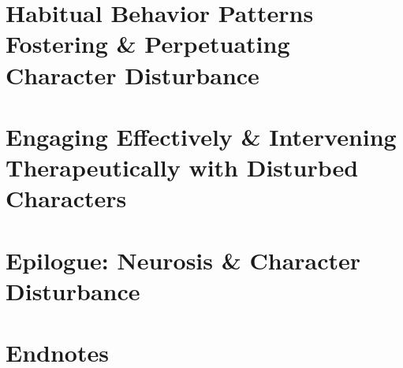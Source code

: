 \documentclass{article}
\numberwithin{equation}{section}
\begin{document}

\section{Habitual Behavior Patterns Fostering \& Perpetuating Character Disturbance}


\section{Engaging Effectively \& Intervening Therapeutically with Disturbed Characters}


\section{Epilogue: Neurosis \& Character Disturbance}


\section*{Endnotes}


\printbibliography[heading=bibintoc]
	
\end{document}
